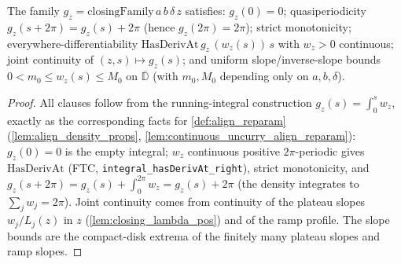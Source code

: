 \begin{lemma}
  \label{lem:closing_family_props}
  The family $g_z=\mathrm{closingFamily}\,a\,b\,\delta\,z$ satisfies: $g_z(0)=0$;
  quasiperiodicity $g_z(s+2\pi)=g_z(s)+2\pi$ (hence $g_z(2\pi)=2\pi$); strict
  monotonicity; everywhere-differentiability $\mathrm{HasDerivAt}\,g_z\,(w_z(s))\,s$
  with $w_z>0$ continuous; joint continuity of $(z,s)\mapsto g_z(s)$; and uniform
  slope/inverse-slope bounds $0<m_0\le w_z(s)\le M_0$ on $\overline{\mathbb{D}}$
  (with $m_0,M_0$ depending only on $a,b,\delta$).
\end{lemma}
\begin{proof}
  All clauses follow from the running-integral construction
  $g_z(s)=\int_0^s w_z$, exactly as the corresponding facts for
  \cref{def:align_reparam} (\cref{lem:align_density_props},
  \cref{lem:continuous_uncurry_align_reparam}): $g_z(0)=0$ is the empty integral;
  $w_z$ continuous positive $2\pi$-periodic gives $\mathrm{HasDerivAt}$ (FTC,
  \texttt{integral\_hasDerivAt\_right}), strict monotonicity, and
  $g_z(s+2\pi)=g_z(s)+\int_0^{2\pi}w_z=g_z(s)+2\pi$ (the density integrates to
  $\sum_j w_j=2\pi$). Joint continuity comes from continuity of the plateau slopes
  $w_j/L_j(z)$ in $z$ (\cref{lem:closing_lambda_pos}) and of the ramp profile. The
  slope bounds are the compact-disk extrema of the finitely many plateau slopes and
  ramp slopes.
\end{proof}

